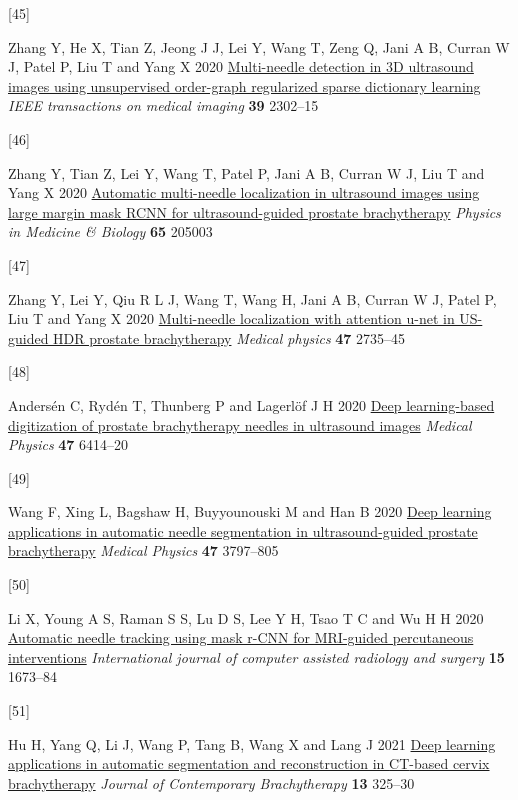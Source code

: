 \documentclass[
  11pt,
]{article}
\newlength{\cslhangindent}
\newlength{\csllabelwidth}
\newenvironment{CSLReferences}[2] %
 {\begin{list}{}{%
  \setlength{\itemindent}{0pt}
  \setlength{\leftmargin}{0pt}
  \setlength{\parsep}{0pt}
  \ifodd #1
   \setlength{\leftmargin}{\cslhangindent}
   \setlength{\itemindent}{-1\cslhangindent}
  \fi
  \setlength{\itemsep}{#2\baselineskip}}}
 {\end{list}}
\newcommand{\CSLLeftMargin}[1]{\parbox[t]{\csllabelwidth}{\strut#1\strut}}
\newcommand{\CSLRightInline}[1]{\parbox[t]{\linewidth - \csllabelwidth}{\strut#1\strut}}
\begin{document}
\begin{CSLReferences}{0}{1}
\CSLLeftMargin{{[}45{]} }%
\CSLRightInline{Zhang Y, He X, Tian Z, Jeong J J, Lei Y, Wang T, Zeng Q,
Jani A B, Curran W J, Patel P, Liu T and Yang X 2020
\href{https://doi.org/10.1109/TMI.2020.2968770}{Multi-needle detection
in 3D ultrasound images using unsupervised order-graph regularized
sparse dictionary learning} \emph{IEEE transactions on medical imaging}
\textbf{39} 2302--15}

\CSLLeftMargin{{[}46{]} }%
\CSLRightInline{Zhang Y, Tian Z, Lei Y, Wang T, Patel P, Jani A B,
Curran W J, Liu T and Yang X 2020
\href{https://doi.org/10.1088/1361-6560/aba410}{Automatic multi-needle
localization in ultrasound images using large margin mask {RCNN} for
ultrasound-guided prostate brachytherapy} \emph{Physics in Medicine \&
Biology} \textbf{65} 205003}

\CSLLeftMargin{{[}47{]} }%
\CSLRightInline{Zhang Y, Lei Y, Qiu R L J, Wang T, Wang H, Jani A B,
Curran W J, Patel P, Liu T and Yang X 2020
\href{https://doi.org/10.1002/mp.14128}{Multi-needle localization with
attention u-net in US-guided HDR prostate brachytherapy} \emph{Medical
physics} \textbf{47} 2735--45}

\CSLLeftMargin{{[}48{]} }%
\CSLRightInline{Andersén C, Rydén T, Thunberg P and Lagerlöf J H 2020
\href{https://doi.org/10.1002/mp.14508}{Deep learning-based digitization
of prostate brachytherapy needles in ultrasound images} \emph{Medical
Physics} \textbf{47} 6414--20}

\CSLLeftMargin{{[}49{]} }%
\CSLRightInline{Wang F, Xing L, Bagshaw H, Buyyounouski M and Han B 2020
\href{https://doi.org/10.1002/mp.14328}{Deep learning applications in
automatic needle segmentation in ultrasound-guided prostate
brachytherapy} \emph{Medical Physics} \textbf{47} 3797--805}

\CSLLeftMargin{{[}50{]} }%
\CSLRightInline{Li X, Young A S, Raman S S, Lu D S, Lee Y H, Tsao T C
and Wu H H 2020
\href{https://doi.org/10.1007/s11548-020-02226-8}{Automatic needle
tracking using mask r-CNN for MRI-guided percutaneous interventions}
\emph{International journal of computer assisted radiology and surgery}
\textbf{15} 1673--84}

\CSLLeftMargin{{[}51{]} }%
\CSLRightInline{Hu H, Yang Q, Li J, Wang P, Tang B, Wang X and Lang J
2021 \href{https://doi.org/10.5114/jcb.2021.106118}{Deep learning
applications in automatic segmentation and reconstruction in {CT}-based
cervix brachytherapy} \emph{Journal of Contemporary Brachytherapy}
\textbf{13} 325--30}


\end{CSLReferences}
\end{document}
